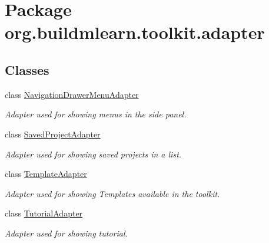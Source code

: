 \hypertarget{namespaceorg_1_1buildmlearn_1_1toolkit_1_1adapter}{\section{Package org.\-buildmlearn.\-toolkit.\-adapter}
\label{namespaceorg_1_1buildmlearn_1_1toolkit_1_1adapter}
}
\subsection*{Classes}
\begin{DoxyCompactItemize}
\item 
class \hyperlink{classorg_1_1buildmlearn_1_1toolkit_1_1adapter_1_1NavigationDrawerMenuAdapter}{Navigation\-Drawer\-Menu\-Adapter}
\begin{DoxyCompactList}\small\item\em Adapter used for showing menus in the side panel. \end{DoxyCompactList}\item 
class \hyperlink{classorg_1_1buildmlearn_1_1toolkit_1_1adapter_1_1SavedProjectAdapter}{Saved\-Project\-Adapter}
\begin{DoxyCompactList}\small\item\em Adapter used for showing saved projects in a list. \end{DoxyCompactList}\item 
class \hyperlink{classorg_1_1buildmlearn_1_1toolkit_1_1adapter_1_1TemplateAdapter}{Template\-Adapter}
\begin{DoxyCompactList}\small\item\em Adapter used for showing Templates available in the toolkit. \end{DoxyCompactList}\item 
class \hyperlink{classorg_1_1buildmlearn_1_1toolkit_1_1adapter_1_1TutorialAdapter}{Tutorial\-Adapter}
\begin{DoxyCompactList}\small\item\em Adapter used for showing tutorial. \end{DoxyCompactList}\end{DoxyCompactItemize}
